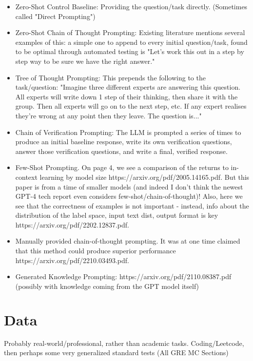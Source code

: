 \documentclass[11pt]{article}
\begin{document}
\begin{itemize}
  \item Zero-Shot Control Baseline: Providing the question/task directly. (Sometimes called "Direct Prompting")
  \item Zero-Shot Chain of Thought Prompting: Existing literature mentions several examples of this: a simple one to append to every initial question/task, found to be optimal through automated testing is "Let's work this out in a step by step way to be sure we have the right answer." \cite{hebenstreit_automatically_2023, zhou_large_2022}
  \item Tree of Thought Prompting: This prepends the following to the task/question: "Imagine three different experts are answering this question. All experts will write down 1 step of their thinking, then share it with the group. Then all experts will go on to the next step, etc. If any expert realises they're wrong at any point then they leave. The question is..." \cite{hulbert_using_2023}
  \item Chain of Verification Prompting: The LLM is prompted a series of times to produce an initial baseline response, write its own verification questions, answer those verification questions, and write a final, verified response. \cite{dhuliawala_chain--verification_2023}
  \item Few-Shot Prompting. On page 4, we see a comparison of the returns to in-context learning by model size https://arxiv.org/pdf/2005.14165.pdf. But this paper is from a time of smaller models (and indeed I don't think the newest GPT-4 tech report even considers few-shot/chain-of-thought)! Also, here we see that the correctness of examples is not important - instead, info about the distribution of the label space, input text dist, output format is key https://arxiv.org/pdf/2202.12837.pdf.
  \item Manually provided chain-of-thought prompting. It was at one time claimed that this method could produce superior performance https://arxiv.org/pdf/2210.03493.pdf.
  \item Generated Knowledge Prompting: https://arxiv.org/pdf/2110.08387.pdf (possibly with knowledge coming from the GPT model itself)
\end{itemize}

\section*{Data}

Probably real-world/professional, rather than academic tasks. Coding/Leetcode, then perhaps some very generalized standard tests (All GRE MC Sections)
\end{document}
